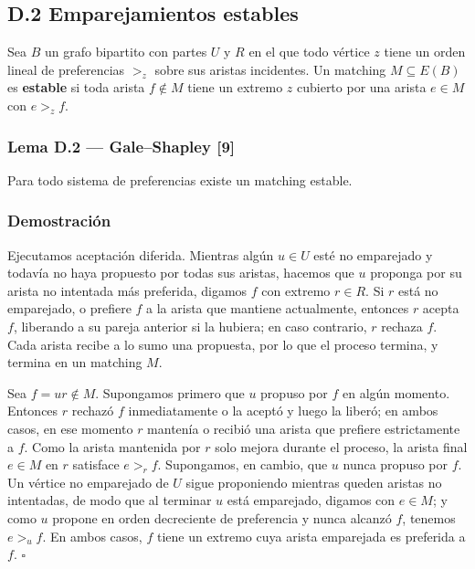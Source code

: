 \documentclass[
  spanish,
  11pt,
  a4paper,
]{article}
\begin{document}
\subsection{D.2 Emparejamientos estables}\label{d.2-emparejamientos-estables}

Sea \(B\) un grafo bipartito con partes \(U\) y \(R\) en el que todo vértice \(z\) tiene un orden lineal de preferencias \(>_z\) sobre sus aristas incidentes. Un matching \(M\subseteq E(B)\) es \textbf{estable} si toda arista \(f\notin M\) tiene un extremo \(z\) cubierto por una arista \(e\in M\) con \(e>_zf\).

\subsubsection{Lema D.2 --- Gale--Shapley {[}9{]}}\label{lema-d.2-galeshapley-9}

Para todo sistema de preferencias existe un matching estable.

\subsubsection{Demostración}\label{demostraciuxf3n-10}

Ejecutamos aceptación diferida. Mientras algún \(u\in U\) esté no emparejado y todavía no haya propuesto por todas sus aristas, hacemos que \(u\) proponga por su arista no intentada más preferida, digamos \(f\) con extremo \(r\in R\). Si \(r\) está no emparejado, o prefiere \(f\) a la arista que mantiene actualmente, entonces \(r\) acepta \(f\), liberando a su pareja anterior si la hubiera; en caso contrario, \(r\) rechaza \(f\). Cada arista recibe a lo sumo una propuesta, por lo que el proceso termina, y termina en un matching \(M\).

Sea \(f=ur\notin M\). Supongamos primero que \(u\) propuso por \(f\) en algún momento. Entonces \(r\) rechazó \(f\) inmediatamente o la aceptó y luego la liberó; en ambos casos, en ese momento \(r\) mantenía o recibió una arista que prefiere estrictamente a \(f\). Como la arista mantenida por \(r\) solo mejora durante el proceso, la arista final \(e\in M\) en \(r\) satisface \(e>_rf\). Supongamos, en cambio, que \(u\) nunca propuso por \(f\). Un vértice no emparejado de \(U\) sigue proponiendo mientras queden aristas no intentadas, de modo que al terminar \(u\) está emparejado, digamos con \(e\in M\); y como \(u\) propone en orden decreciente de preferencia y nunca alcanzó \(f\), tenemos \(e>_uf\). En ambos casos, \(f\) tiene un extremo cuya arista emparejada es preferida a \(f\). \(\square\)
\end{document}
